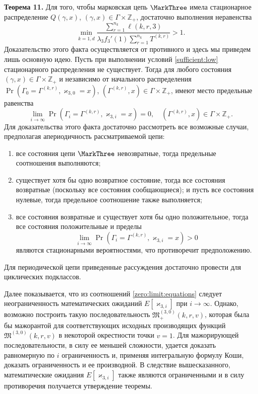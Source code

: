 \textbf{Теорема 11.}
Для того,  чтобы марковская цепь $\MarkThree$ имела стационарное распределение $Q(\gamma, x)$,  $(\gamma, x)\in \Gamma \times {\mathbb Z}_+$, достаточно выполнения неравенства 
\begin{equation}
\min_{k=\overline{1, d}} { \frac{\sum_{r = 1}^{n_k} \ell(k, r, 3) }{\lambda_3 f_3'(1) \sum_{r=1}^{n_k} T^{(k, r)} }}>1.
\label{sufficient:low}
\end{equation}
Доказательство этого факта осуществляется от противного и здесь мы приведем лишь основную идею. Пусть при выполнении условий \eqref{sufficient:low} стационарного распределения не существует.  
Тогда для любого состояния $(\gamma, x)\in \Gamma \times {\mathbb Z}_+$ и независимо от начального распределения $\Pr(\Gamma_{0}=\Gamma^{(k, r)},  \varkappa_{3, 0}=x)$, 
$(\Gamma^{(k, r)}, x)\in \Gamma \times {\mathbb Z}_+$,  
имеют место предельные равенства 
\begin{equation}
\lim_{i \to \infty} \Pr(\Gamma_{i}=\Gamma^{(k, r)},  \varkappa_{3, i}=x) =0,  \quad  (\Gamma^{(k, r)}, x)\in \Gamma \times {\mathbb Z}_+.
\label{zero:limit:equations}
\end{equation} 
Для доказательства этого факта достаточно рассмотреть все возможные случаи,  предполагая апериодичность рассматриваемой цепи:
\begin{enumerate}
\item все состояния цепи $\MarkThree$ невозвратные,  тогда предельные соотношения выполняются;
\item существует хотя бы одно возвратное состояние,  тогда все состояния возвратные (поскольку все состояния сообщающиеся); и пусть все состояния нулевые,  тогда предельное соотношение также выполняется;
\item все состояния возвратные и существует хотя бы одно положительное,  тогда все состояния положительные и пределы 
$$
\lim_{i \to \infty} \Pr(\Gamma_{i}=\Gamma^{(k, r)},  \varkappa_{3, i}=x) > 0
$$
являются стационарными вероятностями, что противоречит предположению.
\end{enumerate}
Для периодической цепи приведенные рассуждения достаточно провести для циклических подклассов.

Далее показывается, что из соотношений \eqref{zero:limit:equations} следует неограниченность математических ожиданий $E[\varkappa_{3,i}]$ при $i \to \infty$. Однако, возможно построить такую последовательность $\mathfrak{M}_+^{(3, 0)}(k, r, v)$, которая была бы мажорантой для соответствующих исходных производящих функций $\mathfrak{M}^{(3, 0)}(k, r, v)$ в некоторой окрестности точки $v=1$. Для мажорирующей последовательности, в силу ее меньшей сложности, удается доказать  равномерную по $i$ ограниченность и, применяя интегральную формулу Коши, доказать ограниченность и ее производной. В следствие вышесказанного, математические ожидания $E[\varkappa_{3,i}]$ также являются ограниченными и в силу противоречия получается утверждение теоремы. 

